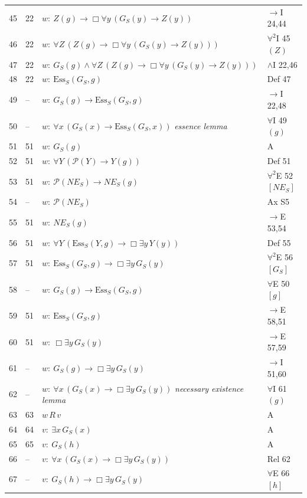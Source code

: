 {\begin{longtable}{@{}r>{\raggedright}p{}p{}>{\raggedright\arraybackslash}p{}@{}}
45 & 22 & $w:\ Z(g) \to \Box \forall y\, (G_{\!S}(y) \to Z(y))$ & $\to$I 24,44\\
46 & 22 & $w:\ \forall Z\, (Z(g) \to \Box \forall y\, (G_{\!S}(y) \to Z(y)))$ & $\forall^2$I 45 $(Z)$\\
47 & 22 & $w:\ G_{\!S}(g) \wedge \forall Z\, (Z(g) \to \Box \forall y\, (G_{\!S}(y) \to Z(y)))$ & $\wedge$I 22,46\\
48 & 22 & $w:\ \mathrm{Ess}_S(G_{\!S},g)$ & Def 47\\
49 & -- & $w:\ G_{\!S}(g) \to \mathrm{Ess}_S(G_{\!S},g)$ & $\to$I 22,48\\
50 & -- & $w:\ \forall x\, (G_{\!S}(x) \to \mathrm{Ess}_S(G_{\!S},x))$ \hfill{\itshape essence lemma} & $\forall$I 49 $(g)$\\
51 & 51 & $w:\ G_{\!S}(g)$ & A\\
52 & 51 & $w:\ \forall Y\, (\mathcal{P}(Y) \to Y(g))$ & Def 51\\
53 & 51 & $w:\ \mathcal{P}(\mathit{NE}_{\!S}) \to \mathit{NE}_{\!S}(g)$ & $\forall^2$E 52 $[\mathit{NE}_{\!S}]$\\
54 & -- & $w:\ \mathcal{P}(\mathit{NE}_{\!S})$ & Ax S5\\
55 & 51 & $w:\ \mathit{NE}_{\!S}(g)$ & $\to$E 53,54\\
56 & 51 & $w:\ \forall Y\, (\mathrm{Ess}_S(Y,g) \to \Box \exists y\, Y(y))$ & Def 55\\
57 & 51 & $w:\ \mathrm{Ess}_S(G_{\!S},g) \to \Box \exists y\, G_{\!S}(y)$ & $\forall^2$E 56 $[G_{\!S}]$\\
58 & -- & $w:\ G_{\!S}(g) \to \mathrm{Ess}_S(G_{\!S},g)$ & $\forall$E 50 $[g]$\\
59 & 51 & $w:\ \mathrm{Ess}_S(G_{\!S},g)$ & $\to$E 58,51\\
60 & 51 & $w:\ \Box \exists y\, G_{\!S}(y)$ & $\to$E 57,59\\
61 & -- & $w:\ G_{\!S}(g) \to \Box \exists y\, G_{\!S}(y)$ & $\to$I 51,60\\
62 & -- & $w:\ \forall x\, (G_{\!S}(x) \to \Box \exists y\, G_{\!S}(y))$ \hfill{\itshape necessary existence lemma} & $\forall$I 61 $(g)$\\
63 & 63 & $w\,R\,v$ & A\\
64 & 64 & $v:\ \exists x\, G_{\!S}(x)$ & A\\
65 & 65 & $v:\ G_{\!S}(h)$ & A\\
66 & -- & $v:\ \forall x\, (G_{\!S}(x) \to \Box \exists y\, G_{\!S}(y))$ & Rel 62\\
67 & -- & $v:\ G_{\!S}(h) \to \Box \exists y\, G_{\!S}(y)$ & $\forall$E 66 $[h]$\\

\end{longtable}}
